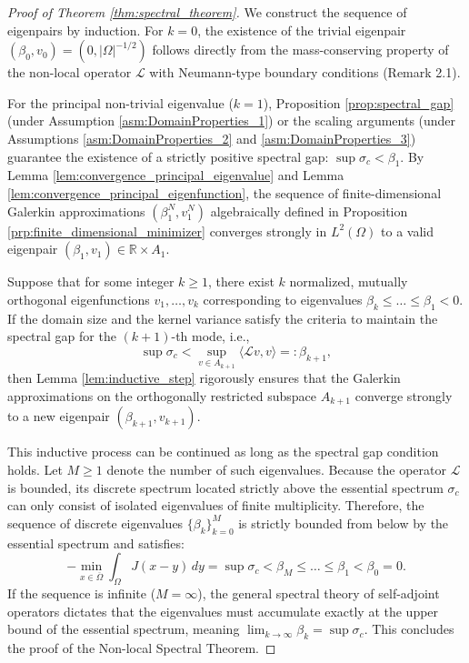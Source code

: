 \documentclass[12pt, a4paper]{article}
\theoremstyle{break}
\theoremstyle{break}
\theoremstyle{break}
\theoremstyle{break}
\theoremstyle{break}
\theoremstyle{break}
\theoremstyle{break}
\theoremstyle{break}
\theoremstyle{break}
\begin{document}
\begin{proof}[Proof of Theorem \ref{thm:spectral_theorem}]
    We construct the sequence of eigenpairs by induction. For $k=0$, the existence of the trivial eigenpair $(\beta_0, v_0) = (0, |\Omega|^{-1/2})$ follows directly from the mass-conserving property of the non-local operator $\mathcal{L}$ with Neumann-type boundary conditions (Remark 2.1).

    For the principal non-trivial eigenvalue ($k=1$), Proposition \ref{prop:spectral_gap} (under Assumption \ref{asm:DomainProperties_1}) or the scaling arguments (under Assumptions \ref{asm:DomainProperties_2} and \ref{asm:DomainProperties_3}) guarantee the existence of a strictly positive spectral gap: $\sup \sigma_c < \beta_1$. By Lemma \ref{lem:convergence_principal_eigenvalue} and Lemma \ref{lem:convergence_principal_eigenfunction}, the sequence of finite-dimensional Galerkin approximations $(\beta_1^N, v_1^N)$ algebraically defined in Proposition \ref{prp:finite_dimensional_minimizer} converges strongly in $L^2(\Omega)$ to a valid eigenpair $(\beta_1, v_1) \in \mathbb{R} \times A_1$.

    Suppose that for some integer $k \geq 1$, there exist $k$ normalized, mutually orthogonal eigenfunctions $v_1, \dots, v_k$ corresponding to eigenvalues $\beta_k \leq \dots \leq \beta_1 < 0$. If the domain size and the kernel variance satisfy the criteria to maintain the spectral gap for the $(k+1)$-th mode, i.e.,
    \begin{equation*}
        \sup \sigma_c < \sup_{v \in A_{k+1}} \langle \mathcal{L}v, v \rangle =: \beta_{k+1},
    \end{equation*}
    then Lemma \ref{lem:inductive_step} rigorously ensures that the Galerkin approximations on the orthogonally restricted subspace $A_{k+1}$ converge strongly to a new eigenpair $(\beta_{k+1}, v_{k+1})$. 
    
    This inductive process can be continued as long as the spectral gap condition holds. Let $M \geq 1$ denote the number of such eigenvalues. Because the operator $\mathcal{L}$ is bounded, its discrete spectrum located strictly above the essential spectrum $\sigma_c$ can only consist of isolated eigenvalues of finite multiplicity. Therefore, the sequence of discrete eigenvalues $\{\beta_k\}_{k=0}^M$ is strictly bounded from below by the essential spectrum and satisfies:
    \begin{equation*}
        -\min_{x \in \overline{\Omega}} \int_\Omega J(x-y) \, dy = \sup \sigma_c < \beta_M \leq \dots \leq \beta_1 < \beta_0 = 0.
    \end{equation*}
    If the sequence is infinite ($M = \infty$), the general spectral theory of self-adjoint operators dictates that the eigenvalues must accumulate exactly at the upper bound of the essential spectrum, meaning $\lim_{k \to \infty} \beta_k = \sup \sigma_c$. This concludes the proof of the Non-local Spectral Theorem.
\end{proof}
\end{document}
